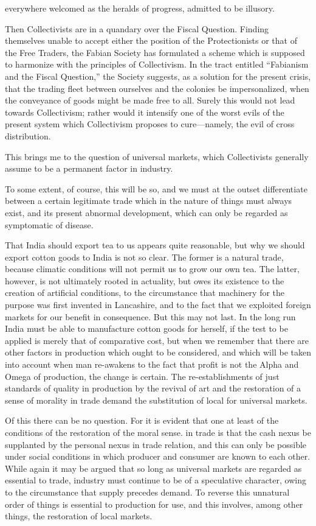 \documentclass{book}
\begin{document}
everywhere welcomed as the heralds of progress, admitted to be illusory.

Then Collectivists are in a quandary over the Fiscal Question. Finding themselves unable to accept either the position of the Protectionists or that of the Free Traders, the Fabian Society has formulated a scheme which is supposed to harmonize with the principles of Collectivism. In the tract entitled “Fabianism and the Fiscal Question,” the Society suggests, as a solution for the present crisis, that the trading fleet between ourselves and the colonies be impersonalized, when the conveyance of goods might be made free to all. Surely this would not lead towards Collectivism; rather would it intensify one of the worst evils of the present system which Collectivism proposes to cure—namely, the evil of cross distribution.

This brings me to the question of universal markets, which Collectivists generally assume to be a permanent factor in industry.

To some extent, of course, this will be so, and we must at the outset differentiate between a certain legitimate trade which in the nature of things must always exist, and its present abnormal development, which can only be regarded as symptomatic of disease.

That India should export tea to us appears quite reasonable, but why we should export cotton goods to India is not so clear. The former is a natural trade, because climatic conditions will not permit us to grow our own tea. The latter, however, is not ultimately rooted in actuality, but owes its existence to the creation of artificial conditions, to the circumstance that machinery for the purpose was first invented in Lancashire, and to the fact that we exploited foreign markets for our benefit in consequence. But this may not last. In the long run India must be able to manufacture cotton goods for herself, if the test to be applied is merely that of comparative cost, but when we remember that there are other factors in production which ought to be considered, and which will be taken into account when man re-awakens to the fact that profit is not the Alpha and Omega of production, the change is certain. The re-establishments of just standards of quality in production by the revival of art and the restoration of a sense of morality in trade demand the substitution of local for universal markets.

Of this there can be no question. For it is evident that one at least of the conditions of the restoration of the moral sense. in trade is that the cash nexus be supplanted by the personal nexus in trade relation, and this can only be possible under social conditions in which producer and consumer are known to each other. While again it may be argued that so long as universal markets are regarded as essential to trade, industry must continue to be of a speculative character, owing to the circumstance that supply precedes demand. To reverse this unnatural order of things is essential to production for use, and this involves, among other things, the restoration of local markets.
\end{document}

